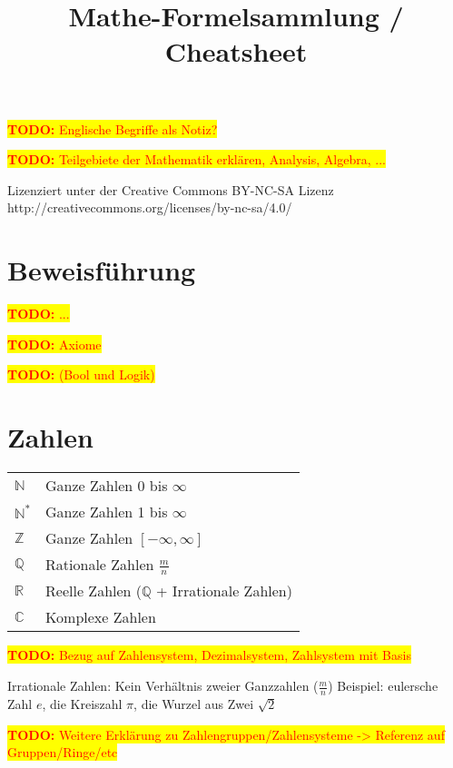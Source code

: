 \documentclass[10pt,a4paper]{article}
\title{Mathe-Formelsammlung / Cheatsheet}
\newcommand{\todo}[1]{\begin{flushleft} \colorbox{yellow}{\textcolor{red}{\textbf{TODO:} {#1}}}\end{flushleft} }
\begin{document}
\maketitle
\tableofcontents
\pagebreak




\todo{Englische Begriffe als Notiz?}
\todo{Teilgebiete der Mathematik erklären, Analysis, Algebra, ...}
\begin{flushleft}
Lizenziert unter  der Creative Commons BY-NC-SA Lizenz \\
http://creativecommons.org/licenses/by-nc-sa/4.0/
\end{flushleft}


\section{Beweisführung}
\todo{...}
\todo{Axiome}
\todo{(Bool und Logik)}




\section{Zahlen}

\begin{tabular}{ll}
$\mathbb{N}$ & Ganze Zahlen 0 bis $\infty$ \\
$\mathbb{N}^*$ & Ganze Zahlen 1 bis $\infty$ \\
$\mathbb{Z}$ & Ganze Zahlen $[-\infty, \infty]$ \\
$\mathbb{Q}$ & Rationale Zahlen $\frac{m}{n}$\\
$\mathbb{R}$ & Reelle Zahlen ($\mathbb{Q}$ + Irrationale Zahlen)\\
$\mathbb{C}$ & Komplexe Zahlen\\
\end{tabular} 

\todo{Bezug auf Zahlensystem, Dezimalsystem, Zahlsystem mit Basis}

Irrationale Zahlen:
Kein Verhältnis zweier Ganzzahlen ($\frac{m}{n}$)
Beispiel: eulersche Zahl $e$, 
die Kreiszahl $\pi$, 
die Wurzel aus Zwei $\scriptstyle\sqrt{2}$ 


\todo{Weitere Erklärung zu Zahlengruppen/Zahlensysteme -> Referenz auf Gruppen/Ringe/etc}
\end{document}
